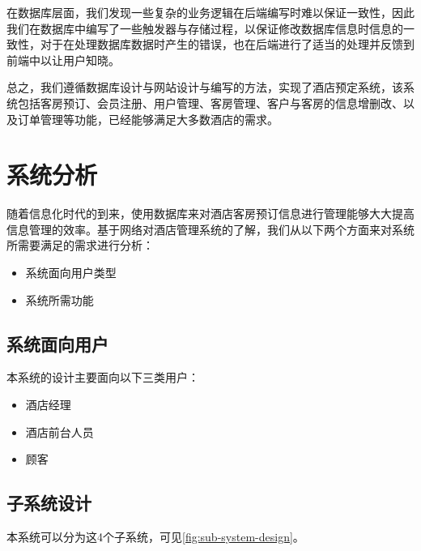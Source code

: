 \documentclass{myreport}
\begin{document}
在数据库层面，我们发现一些复杂的业务逻辑在后端编写时难以保证一致性，因此我们在数据库中编写了一些触发器与存储过程，以保证修改数据库信息时信息的一致性，对于在处理数据库数据时产生的错误，也在后端进行了适当的处理并反馈到前端中以让用户知晓。

总之，我们遵循数据库设计与网站设计与编写的方法，实现了酒店预定系统，该系统包括客房预订、会员注册、用户管理、客房管理、客户与客房的信息增删改、以及订单管理等功能，已经能够满足大多数酒店的需求。

\chapter{系统分析}

随着信息化时代的到来，使用数据库来对酒店客房预订信息进行管理能够大大提高信息管理的效率。基于网络对酒店管理系统的了解，我们从以下两个方面来对系统所需要满足的需求进行分析：

\begin{itemize}
    \item 系统面向用户类型
    \item 系统所需功能
\end{itemize}


\section{系统面向用户}

本系统的设计主要面向以下三类用户：

\begin{itemize}
    \item 酒店经理
    \item 酒店前台人员
    \item 顾客
\end{itemize}


\section{子系统设计}

本系统可以分为这4个子系统，可见\autoref{fig:sub-system-design}。
\end{document}
